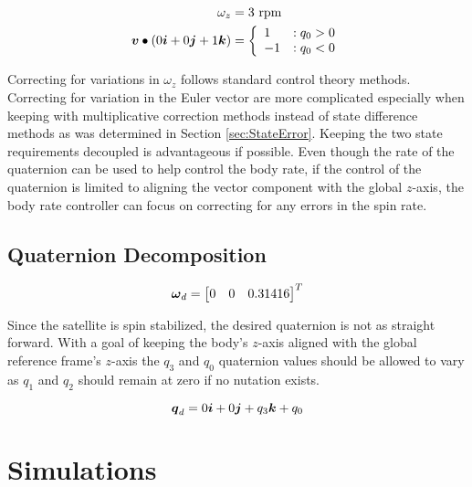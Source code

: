 \begin{equation}
  \begin{aligned}
    \omega_z &= 3 \text{ rpm} \\
    \boldsymbol{v} \bullet (0\boldsymbol{i}+0\boldsymbol{j}+1\boldsymbol{k}) &= \left\{ \begin{array}{lr} 1 & : q_0 > 0 \\ -1 & : q_0 < 0 \end{array} \right.
  \end{aligned}
  \label{}
\end{equation}

Correcting for variations in $\omega_z$ follows standard control theory methods.  Correcting for variation in the Euler vector are more complicated especially when keeping with multiplicative correction methods instead of state difference methods as was determined in Section \ref{sec:StateError}.  Keeping the two state requirements decoupled is advantageous if possible.  Even though the rate of the quaternion can be used to help control the body rate, if the control of the quaternion is limited to aligning the vector component with the global $z$-axis, the body rate controller can focus on correcting for any errors in the spin rate.

\subsection{Quaternion Decomposition}
\label{subsec:QuaternionDecomposition}



\begin{equation}
  \boldsymbol{\omega}_d = \begin{bmatrix} 0 & 0 & 0.31416 \end{bmatrix}^T
  \label{eqn:DesiredBodyRate}
\end{equation}

Since the satellite is spin stabilized, the desired quaternion is not as straight forward.  With a goal of keeping the body's $z$-axis aligned with the global reference frame's $z$-axis the $q_3$ and $q_0$ quaternion values should be allowed to vary as $q_1$ and $q_2$ should remain at zero if no nutation exists.

\begin{equation}
  \boldsymbol{q}_d = 0 \boldsymbol{i} + 0 \boldsymbol{j} + q_3 \boldsymbol{k} + q_0
  \label{eqn:DesiredQuaternion}
\end{equation}



\section{Simulations}
\label{sec:Simulations}

